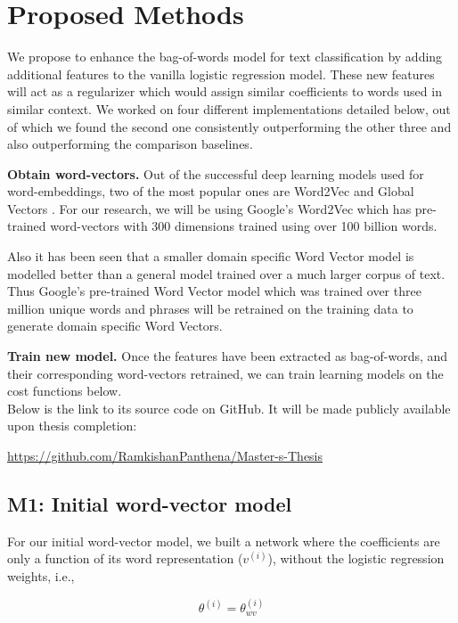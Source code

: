 \newpage
\chapter{Proposed Methods}

We propose to enhance the bag-of-words model for text classification by adding additional features to the vanilla logistic regression model. These new features will act as a regularizer which would assign similar coefficients to words used in similar context. We worked on four different implementations detailed below, out of which we found the second one consistently outperforming the other three and also outperforming the comparison baselines.

\textbf{Obtain word-vectors.}
Out of the successful deep learning models used for word-embeddings, two of the most popular ones are Word2Vec \cite{le2014distributed} and Global Vectors \cite{pennington2014glove}. For our research, we will be using Google's Word2Vec which has pre-trained word-vectors with 300 dimensions trained using over 100 billion words. 

Also it has been seen that a smaller domain specific Word Vector model is modelled better than a general model trained over a much larger corpus of text. Thus Google's pre-trained Word Vector model which was trained over three million unique words and phrases will be retrained on the training data to generate domain specific Word Vectors.

\textbf{Train new model.}
Once the features have been extracted as bag-of-words, and their corresponding word-vectors retrained, we can train learning models on the cost functions below.\\

\noindent Below is the link to its source code on GitHub. It will be made publicly available upon thesis completion:

\noindent \url{https://github.com/RamkishanPanthena/Master-s-Thesis}

\section{M1: Initial word-vector model}

For our initial word-vector model, we built a network where the coefficients are only a function of its word representation ($v^{(i)}$), without the logistic regression weights, i.e.,

\begin{equation}\label{lb1}
\theta^{(i)} = \theta_{wv}^{(i)}
\end{equation}

